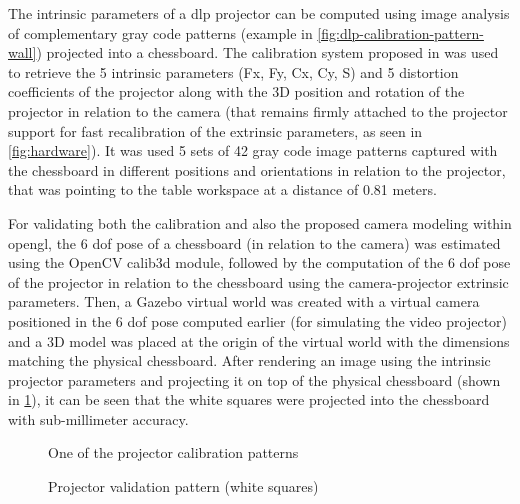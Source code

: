 The intrinsic parameters of a \gls{dlp} projector can be computed using image analysis of complementary gray code patterns (example in \cref{fig:dlp-calibration-pattern-wall}) projected into a chessboard. The calibration system proposed in \cite{Moreno2012} was used to retrieve the 5 intrinsic parameters (Fx, Fy, Cx, Cy, S) and 5 distortion coefficients of the projector along with the 3D position and rotation of the projector in relation to the camera (that remains firmly attached to the projector support for fast recalibration of the extrinsic parameters, as seen in \cref{fig:hardware}). It was used 5 sets of 42 gray code image patterns captured with the chessboard in different positions and orientations in relation to the projector, that was pointing to the table workspace at a distance of 0.81 meters.

For validating both the calibration and also the proposed camera modeling within \gls{opengl}, the 6 \gls{dof} pose of a chessboard (in relation to the camera) was estimated using the OpenCV calib3d module, followed by the computation of the 6 \gls{dof} pose of the projector in relation to the chessboard using the camera-projector extrinsic parameters. Then, a Gazebo virtual world was created with a virtual camera positioned in the 6 \gls{dof} pose computed earlier (for simulating the video projector) and a 3D model was placed at the origin of the virtual world with the dimensions matching the physical chessboard. After rendering an image using the intrinsic projector parameters and projecting it on top of the physical chessboard (shown in \cref{fig:dlp-projected-chessboard}), it can be seen that the white squares were projected into the chessboard with sub-millimeter accuracy.

\begin{figure}[H]
	\begin{floatrow}[2]
		{\caption{One of the projector calibration patterns}\label{fig:dlp-calibration-pattern-wall}\vspace{-0.5em}}
		{\caption{Projector validation pattern (white squares)}\label{fig:dlp-projected-chessboard}\vspace{-0.5em}}
	\end{floatrow}
\end{figure}



